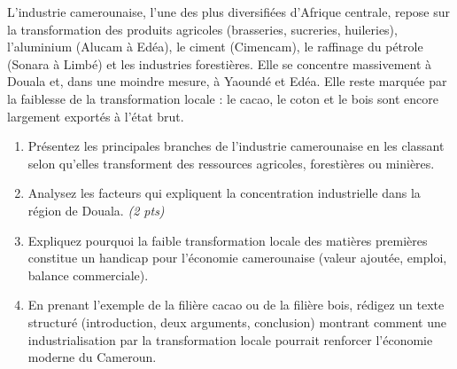 \documentclass[11pt]{article}
\begin{document}
\begin{exercice}
L'industrie camerounaise, l'une des plus diversifiées d'Afrique centrale, repose sur la transformation des produits agricoles (brasseries, sucreries, huileries), l'aluminium (Alucam à Edéa), le ciment (Cimencam), le raffinage du pétrole (Sonara à Limbé) et les industries forestières. Elle se concentre massivement à Douala et, dans une moindre mesure, à Yaoundé et Edéa. Elle reste marquée par la faiblesse de la transformation locale : le cacao, le coton et le bois sont encore largement exportés à l'état brut.

\begin{enumerate}
\item Présentez les principales branches de l'industrie camerounaise en les classant selon qu'elles transforment des ressources agricoles, forestières ou minières.
\item Analysez les facteurs qui expliquent la concentration industrielle dans la région de Douala. \textit{(2 pts)}
\item Expliquez pourquoi la faible transformation locale des matières premières constitue un handicap pour l'économie camerounaise (valeur ajoutée, emploi, balance commerciale).
\item En prenant l'exemple de la filière cacao ou de la filière bois, rédigez un texte structuré (introduction, deux arguments, conclusion) montrant comment une industrialisation par la transformation locale pourrait renforcer l'économie moderne du Cameroun.
\end{enumerate}
\end{exercice}
\end{document}
